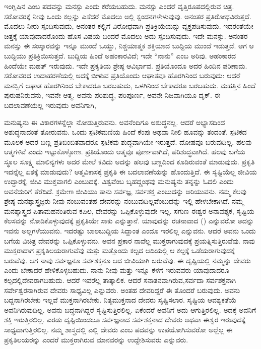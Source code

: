 ಇಂಗ್ಲಿಷಿನ  ಎಂಬ ಪದವನ್ನು ಮನಸ್ಸು ಎಂದು ಕರೆಯಬಹುದು. ಮನಸ್ಸು ಎಂದರೆ ವೃತ್ತಿರೂಪದಲ್ಲಿರುವ ಚಿತ್ರ. ಸರೋವರಕ್ಕೆ ನೀವು ಒಂದು ಕಲ್ಲನ್ನು ಎಸೆದರೆ ಮೊದಲು ಅಲ್ಲಿ ಸ್ಪಂದನಗಳೇಳುವುವು. ಅನಂತರ ಪ್ರತಿರೋಧವಿರುತ್ತದೆ. ಮೊದಲು ನೀರು ಸ್ಪಂದಿಸುವುದು, ಅನಂತರ ಕಲ್ಲಿಗೆ ವಿರೋಧವಾಗಿ ಪ್ರತಿಕ್ರಿಯೆಯನ್ನು ವ್ಯಕ್ತಪಡಿಸುವುದು. ಇದರಂತೆಯೇ ಚಿತ್ತಕ್ಕೆ ಯಾವುದಾದರೊಂದು ಹೊಸ ವಿಷಯ ಬಂದರೆ ಮೊದಲು ಅದು ಸ್ಪಂದಿಸುವುದು. ಇದೇ ಮನಸ್ಸು. ಅನಂತರ ಮನಸ್ಸು ಈ ಸಂಸ್ಕಾರವನ್ನು ಇನ್ನೂ ಮುಂದೆ ಒಯ್ದು, ನಿಶ್ಚಯಾತ್ಮಕ ಶಕ್ತಿಯಾದ ಬುದ್ದಿಯ ಮುಂದೆ ಇಡುತ್ತದೆ. ಆಗ ಆ ಬುದ್ದಿಯು ಪ್ರತಿಕ್ರಿಯಿಸುತ್ತದೆ. ಬುದ್ದಿಯ ಹಿಂದೆ ಅಹಂಕಾರವಿದೆ; ಇದೇ “ನಾನು'' ಎಂಬ ಅರಿವು. ಅಹಂಕಾರದ ಹಿಂದೆಯೇ ಮಹತ್ ಇರುವುದು. ಇದೇ ಪ್ರಕೃತಿಯ ಶ್ರೇಷ್ಠ ಆವಿರ್ಭಾವ. ಪ್ರತಿಯೊಂದೂ ಅದರ ಹಿಂದಿನ ಪರಿಣಾಮ. ಸರೋವರದ ಉದಾಹರಣೆಯಲ್ಲಿ ಅದಕ್ಕೆ ಬೀಳುವ ಪ್ರತಿಯೊಂದು ಆಘಾತವೂ ಹೊರಗಿನಿಂದ ಬರುವುದು: ಆದರೆ ಮನಸ್ಸಿಗೆ ಆಘಾತ ಹೊರಗಿನಿಂದ ಬೇಕಾದರೂ ಬರಬಹುದು, ಒಳಗಿನಿಂದ ಬೇಕಾದರೂ ಬರಬಹುದು. ಮಹತ್ತಿನ ಹಿಂದೆ ಪುರುಷನಿರುವನು, ಇವನೇ ಆತ್ಮ. ಅವನು ಪರಿಶುದ್ಧ, ಪರಿಪೂರ್ಣ, ಅವನೇ ನಿಜವಾಗಿಯೂ ದೃಕ್. ಈ ಬದಲಾವಣೆಯೆಲ್ಲ ಇರುವುದು ಅವನಿಗಾಗಿ,

ಮನುಷ್ಯನು ಈ ವಿಕಾರಗಳನ್ನೆಲ್ಲಾ ನೋಡುತ್ತಿರುವನು. ಅವನೆಂದಿಗೂ ಅಶುದ್ಧನಲ್ಲ. ಆದರೆ ಅಭ್ಯಾಸದಿಂದ ಅಶುದ್ಧನಾದಂತೆ ತೋರುವನು. ಒಂದು ಸ್ಪಟಿಕಮಣಿಯ ಹಿಂದೆ ಕೆಂಪು ಅಥವಾ ನೀಲಿ ಹೂವನ್ನು ತಂದಂತೆ. ಸ್ಪಟಿಕದ ಮೂಲಕ ಅದರ ಬಣ್ಣ ಪ್ರತಿಬಿಂಬಿತವಾದರೂ ಸ್ಪಟಿಕವು ಶುದ್ಧವಾಗಿಯೇ ಇರುತ್ತದೆ. ದೋಷವೂ ಬರುವುದಿಲ್ಲ. ಹಲವು ಆತ್ಮಗಳಿವೆ ಎಂದು ಇಟ್ಟುಕೊಳ್ಳೋಣ. ಪ್ರತಿಯೊಂದು ಆತ್ಮವೂ ಪೂರ್ಣವಾಗಿದೆ, ಪರಿಶುದ್ಧವಾಗಿದೆ. ಹಲವು ಬಗೆಯ ಸ್ಥೂಲ ಸೂಕ್ಷ್ಮ ಮಾಲಿನ್ಯಗಳು ಅದರ ಮೇಲೆ ಕವಿದು ಅದನ್ನು ಹಲವು ಬಣ್ಣದಿಂದ ಕೂಡಿರುವಂತೆ ಮಾಡುವುದು. ಪ್ರಕೃತಿ ಇದನ್ನೆಲ್ಲ ಏತಕ್ಕೆ ಮಾಡುವುದು? ಆತ್ಮವಿಕಾಸಕ್ಕೆ ಪ್ರಕೃತಿ ಈ ಬದಲಾವಣೆಯನ್ನು ಹೊಂದುತ್ತಿದೆ. ಈ ಸೃಷ್ಟಿಯೆಲ್ಲ ಜೀವಿಯ ಉದ್ದಾರಕ್ಕೆ, ಜೀವಿ ಮುಕ್ತವಾಗಲಿ ಎಂಬುದಕ್ಕೆ. ವಿಶ್ವವೆಂಬ ಬೃಹದ್ಗ್ರಂಥವು ಮನುಷ್ಯನು ತನ್ನನ್ನು ಓದಲಿ ಎಂದು ಅವನೆದುರಿಗೆ ತೆರೆದಿದೆ. ಕ್ರಮೇಣ ಜೀವಿಯು ತಾನು ಸರ್ವಜ್ಞ, ಸರ್ವಶಕ್ತ ಎಂಬುದನ್ನು ಅರಿಯುವನು. ನಮ್ಮ ಕೆಲವು ಶ್ರೇಷ್ಠ ಮನಶ್ಶಾಸ್ತ್ರಜ್ಞರು ನೀವು ನಂಬುವಂತಹ ದೇವರನ್ನು ನಂಬುವುದಿಲ್ಲವೆಂಬುದನ್ನು ಇಲ್ಲಿ ಹೇಳಬೇಕಾಗಿದೆ. ನಮ್ಮ ಮನಶ್ಶಾಸ್ತ್ರದ ಪಿತಾಮಹನಂತಿರುವ ಕಪಿಲ, ದೇವರನ್ನು ಒಪ್ಪಿಕೊಳ್ಳುವುದೇ ಇಲ್ಲ. ಸಗುಣ ಈಶ್ವರ ಅನಾವಶ್ಯಕ, ಸೃಷ್ಟಿಯ ಕೆಲಸವನ್ನು ನೋಡಿಕೊಳ್ಳುವುದಕ್ಕೆ ಪ್ರಕೃತಿಯೇ ಸಾಕು ಎನ್ನುತ್ತಾನೆ. ಯಾವುದನ್ನು ರಚನಾವಾದ () ಎನ್ನುವರೋ ಅದನ್ನು ಇವನು ಅಲ್ಲಗಳೆಯುವನು. ಇದರಷ್ಟು ಬಾಲಬುದ್ದಿಯ ಸಿದ್ದಾಂತ ಎಂದೂ ಇರಲಿಲ್ಲ ಎನ್ನುವನು. ಆದರೆ ಅವನು ಒಂದು ಬಗೆಯ ವಿಚಿತ್ರ ದೇವರನ್ನು ಒಪ್ಪಿಕೊಳ್ಳುವನು. ಅವನ ಪ್ರಕಾರ ನಾವೆಲ್ಲ ಮುಕ್ತರಾಗುವುದಕ್ಕೆ ಪ್ರಯತ್ನಿಸುತ್ತಿರುವೆವು. ನಾವು ಮುಕ್ತರಾದಾಗ ಪ್ರಕೃತಿಲಯರಾಗುವೆವು ಮತ್ತು ಮತ್ತೊಂದು ಕಲ್ಪದ ಆದಿಯಲ್ಲಿ ಆ ಕಲ್ಪಕ್ಕೆ ಒಡೆಯರಾಗುವುದಕ್ಕೆ ಬರುವೆವು. ಆಗ ನಾವು ಸರ್ವಜ್ಞನೂ ಸರ್ವಶಕ್ತನೂ ಆದ ಜೀವಿಯಾಗಿ ಬರುವೆವು. ಈ ದೃಷ್ಟಿಯಲ್ಲಿ ನಮ್ಮನ್ನು ದೇವರು ಎಂದು ಬೇಕಾದರೆ ಹೇಳಿಕೊಳ್ಳಬಹುದು. ನಾನು ನೀವು ಮತ್ತು ಇನ್ನೂ ಕೆಳಗೆ ಇರುವವರು ಯಾವುದಾದರೂ ಕಲ್ಪದಲ್ಲಿ\break ದೇವರಾಗಬಹುದು. ಆದರೆ ಇವರೆಲ್ಲ ತಾತ್ಕಾಲಿಕ. ಆದರೆ ಸನಾತನವಾಗಿರುವ,\break ಸರ್ವದಾ ಸರ್ವಶಕ್ತನಾಗಿ ಸರ್ವೇಶ್ವರನಾಗಿರುವ ದೇವರು ಸಾಧ್ಯವಿಲ್ಲ ಎನ್ನುವರು. ಅಂತಹ ದೇವರಿದ್ದರೆ ಈ ತೊಂದರೆ ಬರುವುದು. ಅವನು ಬದ್ದನಾಗಿರಬೇಕು ಇಲ್ಲವೆ ಮುಕ್ತನಾಗಿರಬೇಕು. ನಿತ್ಯಮುಕ್ತನಾದ ದೇವರು ಸೃಷ್ಟಿಸಲಾರ. ಸೃಷ್ಟಿಯ ಆವಶ್ಯಕತೆಯೆ ಅವನಿಗಿರುವುದಿಲ್ಲ. ಅವನು ಬದ್ಧನಾಗಿದ್ದರೆ ಸೃಷ್ಟಿಸುತ್ತಿರಲಿಲ್ಲ. ಏಕೆಂದರೆ ಅವನಿಗೆ ಅದು ಆಗುತ್ತಿರಲಿಲ್ಲ. ಅದಕ್ಕೆ ಅವನಿಗೆ ಶಕ್ತಿ ಇರುತ್ತಿರಲಿಲ್ಲ. ಎರಡು ದೃಷ್ಟಿಯಿಂದಲೂ ಸರ್ವಜ್ಞನಾದ ಸರ್ವಶಕ್ತನಾದ ದೇವರು ಅಥವಾ ಈಶ್ವರ ಇರುವುದಕ್ಕೆ ಸಾಧ್ಯವಾಗುತ್ತಿರಲಿಲ್ಲ. ನಮ್ಮ ಶಾಸ್ತ್ರದಲ್ಲಿ ಎಲ್ಲಿ ದೇವರು ಎಂಬ ಪದವನ್ನು ಉಪಯೋಗಿಸುವರೋ ಅಲ್ಲೆಲ್ಲ ಈ ಪ್ರಕೃತಿಲಯರನ್ನು ಎಂದರೆ ಮುಕ್ತರಾಗಿರುವ ಮಾನವರನ್ನು ಉದ್ದೇಶಿಸುವರು ಎನ್ನುವರು.

